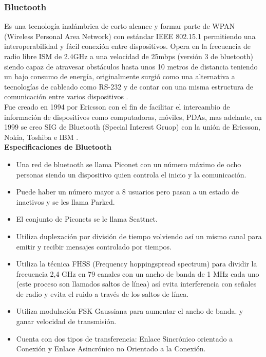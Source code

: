 \documentclass[11pt,openany]{book}
\newcounter{ns}
\begin{document}
	\subsubsection{Bluetooth}
	Es una tecnología inalámbrica de corto alcance y formar parte de WPAN (Wireless Personal Area Network) con estándar IEEE 802.15.1 permitiendo una interoperabilidad y fácil conexión entre dispositivos. Opera en la frecuencia de radio libre ISM de 2.4GHz a una velocidad de 25mbps (versión 3 de bluetooth) siendo capaz de atravesar obstáculos hasta unos 10 metros de distancia teniendo un bajo consumo de energía, originalmente surgió como una alternativa a tecnologías de cableado como RS-232  y de contar con una misma estructura de comunicación entre varios dispositivos \cite{Chavarria2011,VicenteGarcia2011}.\\
	Fue creado en 1994 por Ericsson con el fin de facilitar el intercambio de información de dispositivos como computadoras, móviles, PDAs, mas adelante, en 1999 se creo SIG de Bluetooth (Special Interest Gruop) con la unión de Ericsson, Nokia, Toshiba e IBM \cite{Bluetooth}.\\
	\textbf{Especificaciones de Bluetooth}
	\begin{itemize}
		\item Una red de bluetooth se llama Piconet con un número máximo de ocho personas siendo un dispositivo quien controla el inicio y la comunicación.
		\item Puede haber un número mayor a 8 usuarios pero pasan a un estado de inactivos y se les llama Parked.
		\item El conjunto de Piconets se le llama Scattnet.
		\item Utiliza duplexación por división de tiempo volviendo así un mismo canal para emitir y recibir mensajes controlado por tiempos.
		\item Utiliza la técnica FHSS (Frequency hoppingspread spectrum) para dividir la frecuencia 2,4 GHz en 79 canales con un ancho de banda de 1 MHz cada uno (este proceso son llamados saltos de línea) así evita interferencia con señales de radio y  evita el ruido a través de los saltos de línea.
		\item Utiliza modulación FSK Gaussiana para aumentar el ancho de banda. y ganar velocidad de transmisión.
		\item Cuenta con dos tipos de transferencia: Enlace Sincrónico orientado a Conexión y Enlace Asincrónico no Orientado a la Conexión.
	\end{itemize}
\end{document}
